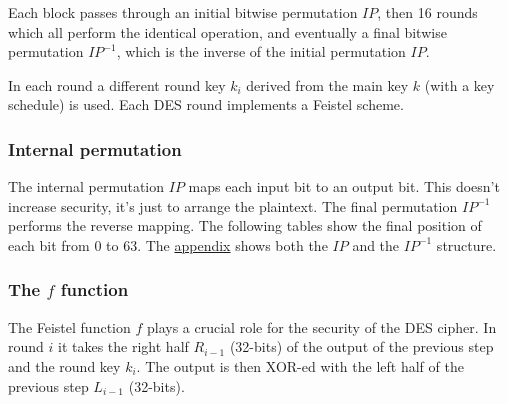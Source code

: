\documentclass{article}
\begin{document}
  Each block passes through an initial bitwise permutation $IP$, then 
  16 rounds which all perform the identical operation, and eventually 
  a final bitwise permutation $IP^{-1}$, which is the inverse of the
  initial permutation $IP$.
  
  \begin{center}
  \end{center}

  In each round a different round key $k_{i}$ derived from the main
  key $k$ (with a key schedule) is used.
  Each DES round implements a Feistel scheme.
  
  \subsubsection{Internal permutation}

  The internal permutation $IP$ maps each input bit to an output bit.
  This doesn't increase security, it's just to arrange the plaintext. 
  The final permutation $IP^{-1}$ performs the reverse mapping.
  The following tables show the final position of each bit from $0$ to 63.
  The \hyperlink{appendix}{appendix} shows both the $IP$ and the
  $IP^{-1}$ structure.

  \subsubsection{The $f$ function}

  The Feistel function $f$ plays a crucial role for the security 
  of the DES cipher. In round $i$ it takes the right half 
  $R_{i-1}$ (32-bits) of the 
  output of the previous step and the round key $k_{i}$.
  The output is then XOR-ed with the left half of the previous step
  $L_{i-1}$ (32-bits).
  
\end{document}
